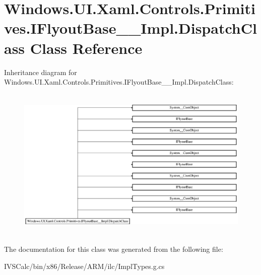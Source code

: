 \hypertarget{class_windows_1_1_u_i_1_1_xaml_1_1_controls_1_1_primitives_1_1_i_flyout_base_____impl_1_1_dispatch_class}{}\section{Windows.\+U\+I.\+Xaml.\+Controls.\+Primitives.\+I\+Flyout\+Base\+\_\+\+\_\+\+Impl.\+Dispatch\+Class Class Reference}
\label{class_windows_1_1_u_i_1_1_xaml_1_1_controls_1_1_primitives_1_1_i_flyout_base_____impl_1_1_dispatch_class}
Inheritance diagram for Windows.\+U\+I.\+Xaml.\+Controls.\+Primitives.\+I\+Flyout\+Base\+\_\+\+\_\+\+Impl.\+Dispatch\+Class\+:\begin{figure}[H]
\begin{center}
\leavevmode
\includegraphics[height=7.403846cm]{class_windows_1_1_u_i_1_1_xaml_1_1_controls_1_1_primitives_1_1_i_flyout_base_____impl_1_1_dispatch_class}
\end{center}
\end{figure}


The documentation for this class was generated from the following file\+:\begin{DoxyCompactItemize}
\item 
I\+V\+S\+Calc/bin/x86/\+Release/\+A\+R\+M/ilc/Impl\+Types.\+g.\+cs\end{DoxyCompactItemize}
